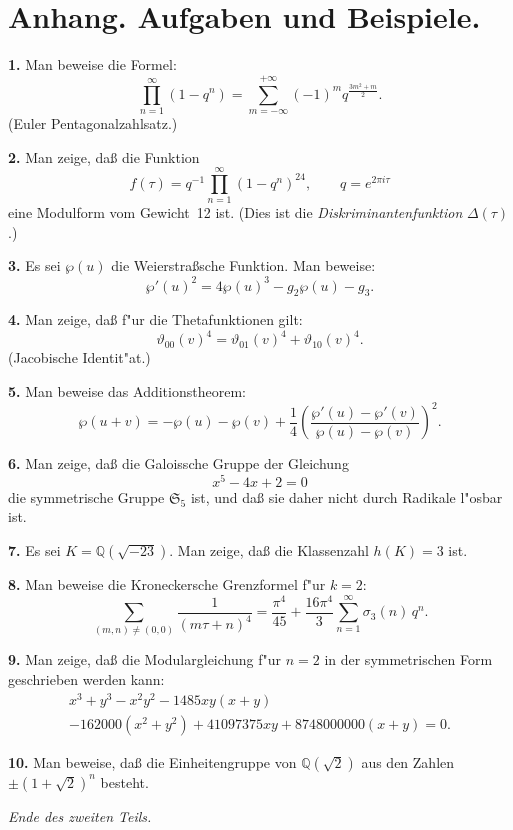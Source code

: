 \documentclass[12pt,a4paper]{article}
\theoremstyle{definition}
\begin{document}
\newpage

\section*{Anhang. Aufgaben und Beispiele.}

\textbf{1.} Man beweise die Formel:
\[\prod_{n=1}^\infty (1-q^n) = \sum_{m=-\infty}^{+\infty} (-1)^m q^{\frac{3m^2+m}{2}}.
\]
(Euler Pentagonalzahlsatz.)

\textbf{2.} Man zeige, da\ss{}{} die Funktion
\[f(\tau) = q^{-1}\prod_{n=1}^\infty (1-q^n)^{24},\qquad q = e^{2\pi i\tau}
\]
eine Modulform vom Gewicht~12 ist. (Dies ist die \emph{Diskriminantenfunktion} $\Delta(\tau)$.)

\textbf{3.} Es sei $\wp(u)$ die Weierstra\ss{}sche Funktion. Man beweise:
\[\wp'(u)^2 = 4\wp(u)^3 - g_2\wp(u) - g_3.
\]

\textbf{4.} Man zeige, da\ss{}{} f"ur die Thetafunktionen gilt:
\[\vartheta_{00}(v)^4 = \vartheta_{01}(v)^4 + \vartheta_{10}(v)^4.
\]
(Jacobische Identit"at.)

\newpage

\textbf{5.} Man beweise das Additionstheorem:
\[\wp(u+v) = -\wp(u) - \wp(v) + \frac{1}{4}\left(\frac{\wp'(u)-\wp'(v)}{\wp(u)-\wp(v)}\right)^2.
\]

\textbf{6.} Man zeige, da\ss{}{} die Galoissche Gruppe der Gleichung
\[x^5 - 4x + 2 = 0
\]
die symmetrische Gruppe $\mathfrak{S}_5$ ist, und da\ss{}{} sie daher nicht durch Radikale l"osbar ist.

\textbf{7.} Es sei $K = \mathbb{Q}(\sqrt{-23})$. Man zeige, da\ss{}{} die Klassenzahl $h(K) = 3$ ist.

\textbf{8.} Man beweise die Kroneckersche Grenzformel f"ur $k=2$:
\[\sum_{(m,n)\neq(0,0)} \frac{1}{(m\tau+n)^4} = \frac{\pi^4}{45} + \frac{16\pi^4}{3}\sum_{n=1}^\infty \sigma_3(n)\,q^n.
\]

\newpage

\textbf{9.} Man zeige, da\ss{}{} die Modulargleichung f"ur $n=2$ in der symmetrischen Form geschrieben werden kann:
\begin{multline*}
x^3 + y^3 - x^2y^2 - 1485xy(x+y)\\
- 162000(x^2+y^2) + 41097375xy + 8748000000(x+y) = 0.
\end{multline*}

\textbf{10.} Man beweise, da\ss{}{} die Einheitengruppe von $\mathbb{Q}(\sqrt{2})$ aus den Zahlen $\pm(1+\sqrt{2})^n$ besteht.

\vfill
\begin{center}
\textit{Ende des zweiten Teils.}
\end{center}
\end{document}
